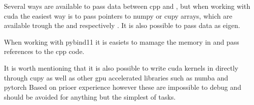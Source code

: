 Several ways are available to pass data between \gls{cpp} and \py, but when working with \gls{cuda} the easiest way is to pass pointers to \gls{numpy} or \gls{cupy} arrays, which are available trough the  and  respectively \cite{numpyArrayInterfaceProtocol} \cite{cupyInteroperabilityCuPy12}.
It is also possible to pass data as \gls{eigen}.

When working with \gls{pybind11} it is easiets to mamage the memory in \py and pass references to the \gls{cpp} code.

It is worth mentioning that it is also possible to write \gls{cuda} kernels in \py directly through \gls{cupy} as well as other \gls{gpu} accelerated libraries such as \gls{numba} and \gls{pytorch}
Based on prioer experience however these are impossible to debug and should be avoided for anything but the simplest of tasks.